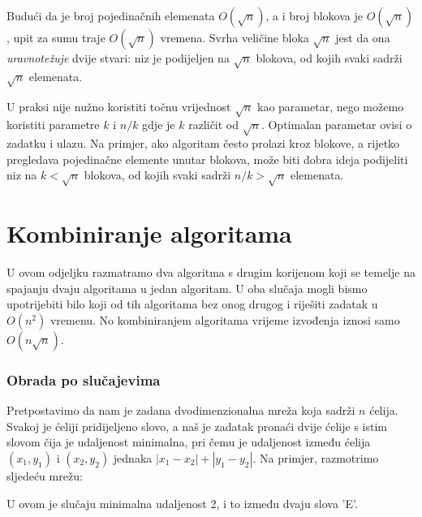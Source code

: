Budući da je broj pojedinačnih elemenata $O(\sqrt n)$,
a i broj blokova je $O(\sqrt n)$,
upit za sumu traje $O(\sqrt n)$ vremena.
Svrha veličine bloka $\sqrt n$ jest
da ona \emph{uravnotežuje} dvije stvari:
niz je podijeljen na $\sqrt n$ blokova,
od kojih svaki sadrži $\sqrt n$ elemenata.

U praksi nije nužno koristiti
točnu vrijednost $\sqrt n$ kao parametar,
nego možemo koristiti parametre $k$ i $n/k$ gdje je $k$
različit od $\sqrt n$.
Optimalan parametar ovisi o zadatku i ulazu.
Na primjer, ako algoritam često prolazi
kroz blokove, a rijetko pregledava
pojedinačne elemente unutar blokova,
može biti dobra ideja podijeliti niz na
$k < \sqrt n$ blokova, od kojih svaki sadrži $n/k > \sqrt n$
elemenata.

\section{Kombiniranje algoritama}

U ovom odjeljku razmatramo dva algoritma s drugim korijenom
koji se temelje na spajanju dvaju algoritama u jedan algoritam.
U oba slučaja mogli bismo upotrijebiti bilo koji od tih algoritama
bez onog drugog
i riješiti zadatak u $O(n^2)$ vremenu.
No kombiniranjem algoritama vrijeme
izvođenja iznosi samo $O(n \sqrt n)$.

\subsubsection{Obrada po slučajevima}

Pretpostavimo da nam je zadana dvodimenzionalna
mreža koja sadrži $n$ ćelija.
Svakoj je ćeliji pridijeljeno slovo,
a naš je zadatak pronaći dvije ćelije
s istim slovom čija je udaljenost minimalna,
pri čemu je udaljenost između ćelija
$(x_1,y_1)$ i $(x_2,y_2)$ jednaka $|x_1-x_2|+|y_1-y_2|$.
Na primjer, razmotrimo sljedeću mrežu:

\begin{center}
\end{center}
U ovom je slučaju minimalna udaljenost 2, i to između dvaju slova 'E'.

